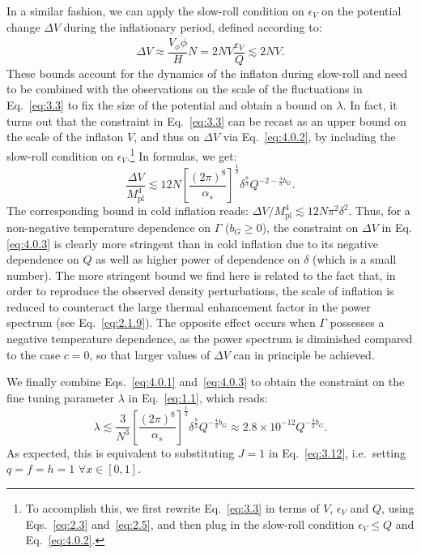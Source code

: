 \documentclass[aps,prd,twocolumn,amssymb,amsmath,floatfix,nofootinbib,superscriptaddress,preprintnumbers]{revtex4-1}
\begin{document}
In a similar fashion, we can apply the slow-roll condition on $\epsilon_V$ on the potential change $\Delta V$ during the inflationary period, defined according to:
\begin{equation}
    \Delta V \approx \frac{V_\phi \dot{\phi}}{H}N
     = 2N V\frac{\epsilon_V}{Q} \lesssim 2N V. \label{eq:4.0.2}
\end{equation}
These bounds account for the dynamics of the inflaton during slow-roll and need to be combined with the observations on the scale of the fluctuations in Eq.~\ref{eq:3.3} to fix the size of the potential and obtain a bound on $\lambda$. In fact, it turns out that the constraint in Eq.~\ref{eq:3.3} can be recast as an upper bound on the scale of the inflaton $V$, and thus on $\Delta V$ via Eq.~\ref{eq:4.0.2}, by including the slow-roll condition on $\epsilon_V$.\footnote{To accomplish this, we first rewrite Eq.~\ref{eq:3.3} in terms of $V$, $\epsilon_V$ and $Q$, using Eqs.~\ref{eq:2.3} and~\ref{eq:2.5}, and then plug in the slow-roll condition $\epsilon_V\leq Q$ and Eq.~\ref{eq:4.0.2}.} In formulas, we get:
\begin{equation}
    \frac{\Delta V}{M_{\mathrm{pl}}^4}\lesssim 12N\left[\frac{(2\pi)^8}{\alpha_s}\right]^{\frac{1}{3}}\delta^{\frac{8}{3}}Q^{-2-\frac{4}{3}b_G}. \label{eq:4.0.3}
\end{equation}
The corresponding bound in cold inflation reads: $\Delta V/M_{\mathrm{pl}}^4\lesssim 12 N\pi^2\delta^2 $. Thus, for a non-negative temperature dependence on $\Gamma$ ($b_G\geq 0$), the constraint on $\Delta V$ in Eq.\ref{eq:4.0.3} is clearly more stringent than in cold inflation due to its negative dependence on $Q$ as well as higher power of dependence on $\delta$ (which is a small number). The more stringent bound we find here is related to the fact that, in order to reproduce the observed density perturbations, the scale of inflation is reduced to counteract the large thermal enhancement factor in the power spectrum (see Eq.~\ref{eq:2.1.9}). The opposite effect occurs when $\Gamma$ possesses a negative temperature dependence, as the power spectrum is diminished compared to the case $c=0$, so that larger values of $\Delta V$ can in principle be achieved.

We finally combine Eqs.~\ref{eq:4.0.1} and~\ref{eq:4.0.3} to obtain the constraint on the fine tuning parameter $\lambda$ in Eq.~\ref{eq:1.1}, which reads:
\begin{equation}
    \lambda\lesssim \frac{3}{N^3}\left[\frac{(2\pi)^8}{\alpha_s}\right]^{\frac{1}{3}}\delta^{\frac{8}{3}}Q^{-\frac{4}{3}b_G}\approx 2.8\times 10^{-12} Q^{-\frac{4}{3}b_G}. \label{eq:4.0.4}
\end{equation}
As expected, this is equivalent to substituting $J=1$ in Eq.~\ref{eq:3.12}, i.e.\ setting $q=f=h=1$ $\forall x \in [0,1]$. 
\end{document}
